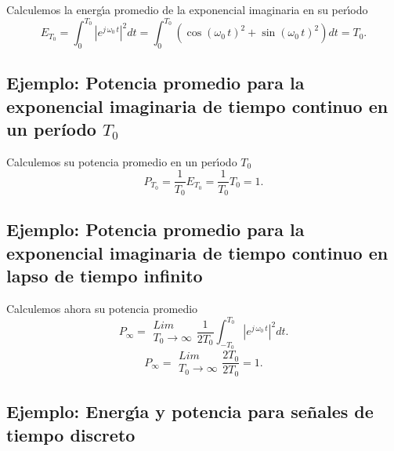 Calculemos la energ\'{\i}a promedio de la exponencial imaginaria
en su per\'{\i}odo
\begin{equation}
  E_{T_{0}}=\int_{0}^{T_{0}}\left| e^{j \, \omega_{0} \, t}\right|
  ^{2}dt=\int_{0}^{T_{0}}\left( \cos \left( \omega_{0} \, t\right) ^{2}+\sin
    \left( \omega_{0} \, t\right) ^{2}\right) dt=T_{0}. \label{potfmuno}
\end{equation}

\subsection{Ejemplo: Potencia promedio para la exponencial imaginaria de tiempo continuo en un período $T_{0}$}

Calculemos su potencia promedio en un per\'{\i}odo $T_{0}$ 
\begin{equation}
  P_{T_{0}}=\frac{1}{T_{0}}E_{T_{0}}=\frac{1}{T_{0}}T_{0}=1. \label{potfmdos}
\end{equation}

\subsection{Ejemplo: Potencia promedio para la exponencial imaginaria de tiempo continuo en lapso de tiempo infinito}

Calculemos ahora su potencia promedio
\begin{equation}
  P_{\infty }= 
  \begin{array}{l}
    Lim \\ 
    T_{0}\rightarrow \infty
  \end{array}
  \frac{1}{2T_{0}}\int_{-T_{0}}^{T_{0}}\left| e^{j \, \omega_{0} \, t}\right|^{2}dt.
\end{equation}
\begin{equation}
  P_{\infty }= 
  \begin{array}{l}
    Lim \\ 
    T_{0}\rightarrow \infty
  \end{array}
  \frac{2T_{0}}{2T_{0}}=1.
\end{equation}

\subsection{Ejemplo: Energ\'{\i}a y potencia para señales de tiempo discreto}

